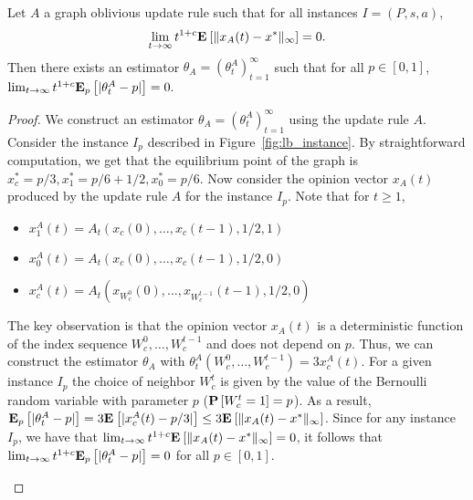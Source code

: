 \begin{lemma}\label{l:reduction}
  Let $A$ a graph oblivious update rule such that for all instances $I=(P,s,a)$,
  \[\lim_{t \rightarrow \infty} t^{1+c}
  \bm{\mathrm{E}}_{} \left[ \| x_A(t)-x^* \|_{\infty} \right]=0.\]
  Then there exists an estimator $\theta_A=(\theta_t^A)_{t=1}^\infty$ such that for all
  $p \in [0,1]$,
  \(\lim_{t \rightarrow \infty}t^{1+c}\bm{\mathrm{E}}_{p} \left[ |\theta_t^A-p| \right]=0.\)
\end{lemma}
\begin{proof}
  We construct an estimator $\theta_A = (\theta^A_t)_{t=1}^\infty$
  using the update rule $A$. Consider the instance $I_p$ described in
  Figure~\ref{fig:lb_instance}.
  By straightforward computation, we get that the equilibrium point of
  the graph is $x_c^* = p/3, x_1^* = p/6+1/2, x_0^* = p/6$.
  Now consider the opinion vector $x_A(t)$ produced by the update
  rule $A$ for the instance $I_p$. Note that for $t \geq 1$,
  \begin{itemize}
   \item  $x_1^A(t)=A_t(x_c(0),\ldots,x_c(t-1),1/2,1)$
   \item  $x_0^A(t)=A_t(x_c(0),\ldots,x_c(t-1),1/2,0)$
   \item  $x_c^A(t)=A_t(x_{W_c^0}(0),\ldots,x_{W_c^{t-1}}(t-1),1/2,0)$
  \end{itemize}
  The key observation is that the opinion vector $x_A(t)$ is a deterministic function
  of the index sequence $W_c^0,\ldots,W_c^{t-1}$ and does not depend on $p$. Thus,
  we can construct the estimator $\theta_A$ with
  $\theta_t^A(W_c^0,\ldots,W_c^{t-1}) = 3x_c^A(t)$.
  For a given instance $I_p$ the choice of neighbor $W_c^t$ is given by the value of
  the Bernoulli random variable with parameter $p$ ($\bm{\mathrm{P}}\left[W_c^t=1\right]=p$). As a result,
  $\bm{\mathrm{E}}_{p} \left[ |\theta_t^A-p| \right]=
  3\bm{\mathrm{E}}_{} \left[ |x_c^A(t)-p/3| \right]\leq 3\bm{\mathrm{E}}_{} \left[ \| x_A(t)-x^* \|_{\infty} \right]$.
  Since for any instance $I_p$, we have that
  $\lim_{t \rightarrow \infty} t^{1+c}\bm{\mathrm{E}}_{} \left[ \| x_A(t)-x^* \|_{\infty} \right]=0$,
  it follows that $\lim_{t \rightarrow \infty}t^{1+c}\bm{\mathrm{E}}_{p} \left[ |\theta_t^A -p| \right]=0$
  for all $p \in [0,1]$.
  \vspace{-5mm}
  \begin{figure}
    \centering
\end{figure}
\end{proof}
